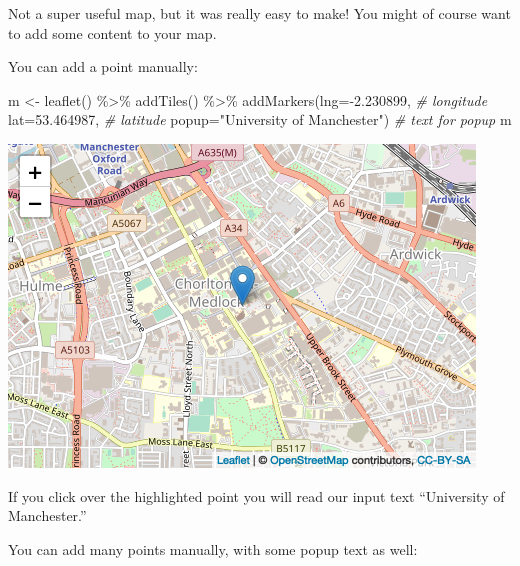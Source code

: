 \documentclass[
]{book}
\makeatletter
\newenvironment{Shaded}{\begin{snugshade}}{\end{snugshade}}
\newcommand{\AttributeTok}[1]{\textcolor[rgb]{0.61,0.61,0.61}{#1}}
\newcommand{\CommentTok}[1]{\textcolor[rgb]{0.37,0.37,0.37}{\textit{#1}}}
\newcommand{\FloatTok}[1]{\textcolor[rgb]{0.06,0.06,0.06}{#1}}
\newcommand{\FunctionTok}[1]{\textcolor[rgb]{0,0,0}{#1}}
\newcommand{\NormalTok}[1]{#1}
\newcommand{\OtherTok}[1]{\textcolor[rgb]{0.37,0.37,0.37}{#1}}
\newcommand{\SpecialCharTok}[1]{\textcolor[rgb]{0,0,0}{#1}}
\newcommand{\StringTok}[1]{\textcolor[rgb]{0.5,0.5,0.5}{#1}}
\newenvironment{kframe}{%
\medskip{}
\setlength{\fboxsep}{.8em}
 \def\at@end@of@kframe{}%
 \ifinner\ifhmode%
  \def\at@end@of@kframe{\end{minipage}}%
  \begin{minipage}{\columnwidth}%
 \fi\fi%
 \def\FrameCommand##1{\hskip\@totalleftmargin \hskip-\fboxsep
 \colorbox{shadecolor}{##1}\hskip-\fboxsep
     \hskip-\linewidth \hskip-\@totalleftmargin \hskip\columnwidth}%
 \MakeFramed {\advance\hsize-\width
   \@totalleftmargin\z@ \linewidth\hsize
   \@setminipage}}%
 {\par\unskip\endMakeFramed%
 \at@end@of@kframe}
\renewenvironment{Shaded}{\begin{kframe}}{\end{kframe}}
\makeatother
\begin{document}
Not a super useful map, but it was really easy to make! You might of course want to add some content to your map.

You can add a point manually:

\begin{Shaded}
\begin{Highlighting}[]
\NormalTok{m }\OtherTok{\textless{}{-}} \FunctionTok{leaflet}\NormalTok{() }\SpecialCharTok{\%\textgreater{}\%}
  \FunctionTok{addTiles}\NormalTok{()  }\SpecialCharTok{\%\textgreater{}\%} 
  \FunctionTok{addMarkers}\NormalTok{(}\AttributeTok{lng=}\SpecialCharTok{{-}}\FloatTok{2.230899}\NormalTok{,  }\CommentTok{\# longitude}
             \AttributeTok{lat=}\FloatTok{53.464987}\NormalTok{,  }\CommentTok{\# latitude}
             \AttributeTok{popup=}\StringTok{"University of Manchester"}\NormalTok{) }\CommentTok{\# text for popup}
\NormalTok{m  }
\end{Highlighting}
\end{Shaded}

\includegraphics{crime_mapping_files/figure-latex/unnamed-chunk-49-1.png}

If you click over the highlighted point you will read our input text ``University of Manchester.''

You can add many points manually, with some popup text as well:
\end{document}
